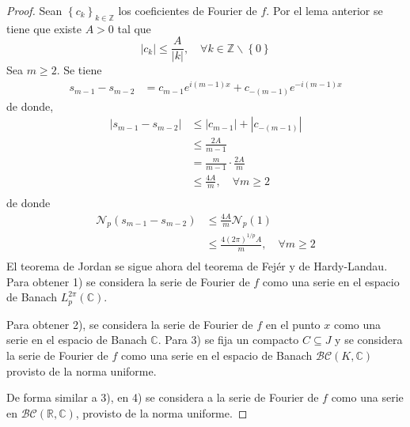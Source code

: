 \documentclass[12pt]{report}
\theoremstyle{largebreak}
\renewcommand{\leq}{\ensuremath{\leqslant}}
\renewcommand{\geq}{\ensuremath{\geqslant}}
\newcommand\abs[1]{\ensuremath{\left|#1\right|}}
\newcommand{\N}[2]{\ensuremath{\mathcal{N}_{#1}\left(#2\right)}}
\begin{document}
    \begin{proof}
        Sean $\left\{c_k \right\}_{ k\in\mathbb{Z}}$ los coeficientes de Fourier de $f$. Por el lema anterior se tiene que existe $A>0$ tal que
        \begin{equation*}
            \abs{c_k}\leq\frac{A}{\abs{k}},\quad\forall k\in\mathbb{Z}\backslash\left\{0\right\}
        \end{equation*}
        Sea $m\geq2$. Se tiene 
        \begin{equation*}
            \begin{split}
                s_{ m-1}-s_{ m-2}&=c_{ m-1}e^{ i(m-1)x}+c_{ -(m-1)}e^{ -i(m-1)x}
            \end{split}
        \end{equation*}
        de donde,
        \begin{equation*}
            \begin{split}
                \abs{s_{ m-1}-s_{ m-2}}&\leq\abs{c_{ m-1}}+\abs{c_{ -(m-1)}}\\
                &\leq\frac{2A}{m-1}\\
                &=\frac{m}{m-1}\cdot\frac{2A}{m}\\
                &\leq\frac{4A}{m},\quad\forall m\geq2\\
            \end{split}
        \end{equation*}
        de donde
        \begin{equation*}
            \begin{split}
                \N{p}{s_{ m-1}-s_{ m-2}}&\leq\frac{4A}{m}\N{p}{1}\\
                &\leq\frac{4(2\pi)^{1/p}A}{m},\quad\forall m\geq 2\\
            \end{split}
        \end{equation*}
        El teorema de Jordan se sigue ahora del teorema de Fejér y de Hardy-Landau. Para obtener 1) se considera la serie de Fourier de $f$ como una serie en el espacio de Banach $L_p^{2\pi}(\mathbb{C})$.

        Para obtener 2), se considera la serie de Fourier de $f$ en el punto $x$ como una serie en el espacio de Banach $\mathbb{C}$. Para 3) se fija un compacto $C\subseteq J$ y se considera la serie de Fourier de $f$ como una serie en el espacio de Banach $\mathcal{BC}(K,\mathbb{C})$ provisto de la norma uniforme.

        De forma similar a 3), en 4) se considera a la serie de Fourier de $f$ como una serie en $\mathcal{ BC}(\mathbb{R},\mathbb{C})$, provisto de la norma uniforme.
    \end{proof}
\end{document}

